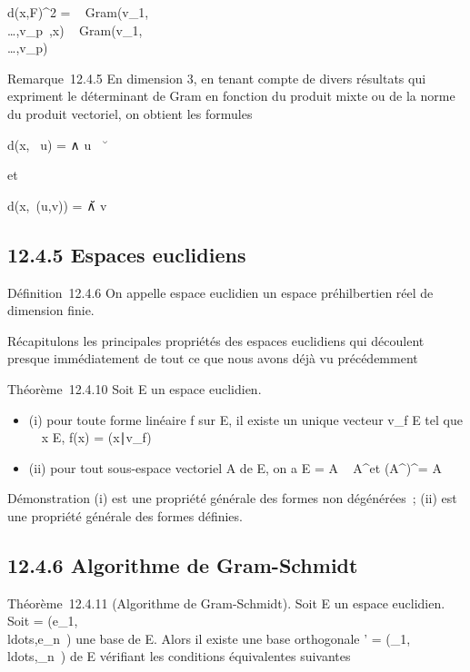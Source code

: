 \documentclass[]{article}
\begin{document}
d(x,F)^2 =
~
Gram(v_1,\\\ldots,v_p~,x)
\over
{}~
Gram(v_1,\\\ldots,v_p)~

Remarque~12.4.5 En dimension 3, en tenant compte de divers résultats qui
expriment le déterminant de Gram en fonction du produit mixte ou de la
norme du produit vectoriel, on obtient les formules

d(x, ~u) = \x ∧ u\
\over
\u\

et

d(x,\mathrmVect~(u,v)) =
\big  [u,v,x] \big
 \over \u ∧
v\

\subsection{12.4.5 Espaces euclidiens}

Définition~12.4.6 On appelle espace euclidien un espace préhilbertien
réel de dimension finie.

Récapitulons les principales propriétés des espaces euclidiens qui
découlent presque immédiatement de tout ce que nous avons déjà vu
précédemment

Théorème~12.4.10 Soit E un espace euclidien.

\begin{itemize}
\itemsep1pt\parskip0pt
\item
  (i) pour toute forme linéaire f sur E, il existe un unique vecteur
  v_f \in E tel que \forall~~x \in E, f(x) =
  (x∣v_f)
\item
  (ii) pour tout sous-espace vectoriel A de E, on a E = A \oplus~
  A^\bot et (A^\bot)^\bot = A
\end{itemize}

Démonstration (i) est une propriété générale des formes non dégénérées~;
(ii) est une propriété générale des formes définies.

\subsection{12.4.6 Algorithme de Gram-Schmidt}

Théorème~12.4.11 (Algorithme de Gram-Schmidt). Soit E un espace
euclidien. Soit  =
(e_1,\\ldots,e_n~)
une base de E. Alors il existe une base orthogonale ' =
(\epsilon_1,\\ldots,\epsilon_n~)
de E vérifiant les conditions équivalentes suivantes
\end{document}
